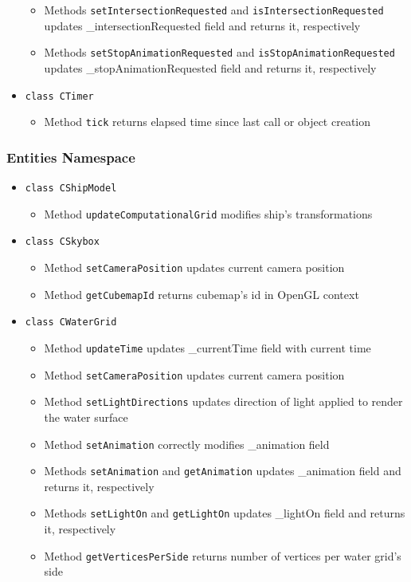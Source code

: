 \documentclass{report}
\begin{document}
\begin{itemize}
\begin{itemize}
			\item Methods \texttt{setIntersectionRequested} and \texttt{isIntersectionRequested} updates \_intersectionRequested field and returns it, respectively 
			\item Methods \texttt{setStopAnimationRequested} and \texttt{isStopAnimationRequested} updates \_stopAnimationRequested field and returns it, respectively
		\end{itemize}
%
%	
\item \texttt{class CTimer}
		\begin{itemize}
			\item Method \texttt{tick} returns elapsed time since last call or object creation
		\end{itemize}
\end{itemize}
\subsubsection{Entities Namespace}
\begin{itemize}
%
%	
\item \texttt{class CShipModel}
		\begin{itemize}
			\item Method \texttt{updateComputationalGrid} modifies ship's transformations
		\end{itemize}
%
%	
\item \texttt{class CSkybox}
		\begin{itemize}
			\item Method \texttt{setCameraPosition} updates current camera position
			\item Method \texttt{getCubemapId} returns cubemap's id in OpenGL context
		\end{itemize}		

%
%	
\item \texttt{class CWaterGrid}
		\begin{itemize}
			\item Method \texttt{updateTime} updates \_currentTime field with current time 
			\item Method \texttt{setCameraPosition} updates current camera position
			\item Method \texttt{setLightDirections} updates direction of light applied to render the water surface
			\item Method \texttt{setAnimation} correctly modifies \_animation field
			\item Methods \texttt{setAnimation} and \texttt{getAnimation} updates \_animation field and returns it, respectively 
			\item Methods \texttt{setLightOn} and \texttt{getLightOn} updates \_lightOn field and returns it, respectively 
			\item Method \texttt{getVerticesPerSide} returns number of vertices per water grid's side

		\end{itemize}			
		
\end{itemize}
\end{document}
